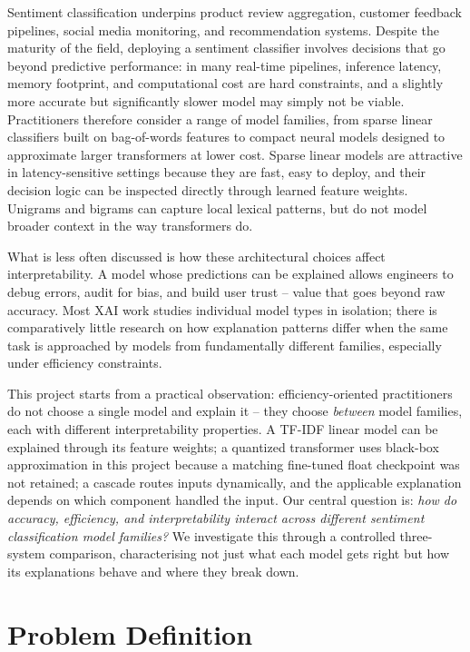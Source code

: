 \documentclass[10pt]{article}
\begin{document}
Sentiment classification underpins product review aggregation, customer
feedback pipelines, social media monitoring, and recommendation systems.
Despite the maturity of the field, deploying a sentiment classifier involves
decisions that go beyond predictive performance: in many real-time pipelines,
inference latency, memory footprint, and computational cost are hard
constraints, and a slightly more accurate but significantly slower model may
simply not be viable.  Practitioners therefore consider a range of model
families, from sparse linear classifiers built on bag-of-words features to
compact neural models designed to approximate larger transformers at lower cost.
Sparse linear models are attractive in latency-sensitive settings because they
are fast, easy to deploy, and their decision logic can be inspected directly
through learned feature weights. Unigrams and bigrams can capture local
lexical patterns, but do not model broader context in the way transformers do.

What is less often discussed is how these architectural choices affect
interpretability.  A model whose predictions can be explained allows engineers
to debug errors, audit for bias, and build user trust -- value that goes beyond
raw accuracy.  Most XAI work studies individual model types in isolation; there
is comparatively little research on how explanation patterns differ when the
same task is approached by models from fundamentally different families,
especially under efficiency constraints.

This project starts from a practical observation: efficiency-oriented
practitioners do not choose a single model and explain it -- they choose
\emph{between} model families, each with different interpretability properties.
A TF-IDF linear model can be explained through its feature weights; a quantized
transformer uses black-box approximation in this project because a matching fine-tuned
float checkpoint was not retained; a cascade routes inputs dynamically, and
the applicable explanation depends on which component handled the input.  Our
central question is: \emph{how do accuracy, efficiency, and interpretability
interact across different sentiment classification model families?}  We
investigate this through a controlled three-system comparison, characterising
not just what each model gets right but how its explanations behave and where
they break down.


\section{Problem Definition}
\end{document}
